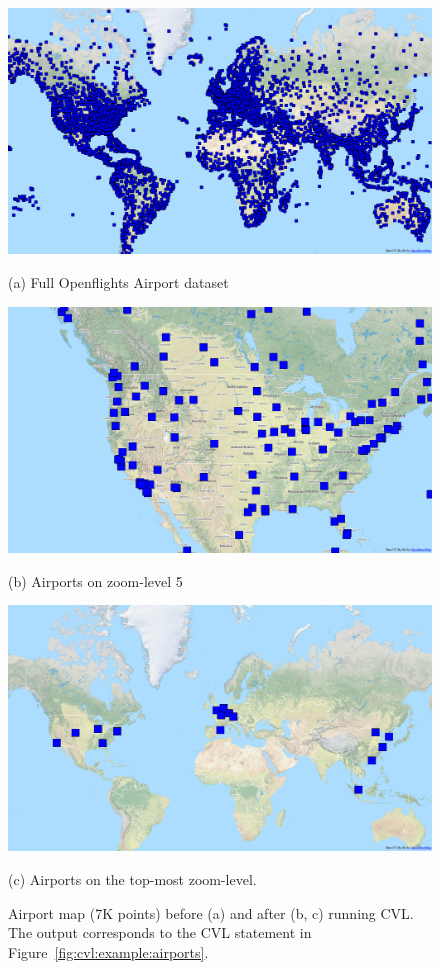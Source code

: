 \begin{figure}[tb]
  \begin{minipage}{0.329\linewidth}
    \centerline{\includegraphics[width=0.95\linewidth]{./figs/airports.png}}
    \centerline{(a) Full Openflights Airport dataset}
  \end{minipage} \hfill
  \begin{minipage}{0.329\linewidth}
    \centerline{\includegraphics[width=0.95\linewidth]{./figs/airports_z4.png}}
    \centerline{(b) Airports on zoom-level 5}
  \end{minipage} \hfill
  \begin{minipage}{0.329\linewidth}
    \centerline{\includegraphics[width=0.95\linewidth]{./figs/airports_z0.png}}
    \centerline{(c) Airports on the top-most zoom-level.}
  \end{minipage}
  \vspace{-0ex}
  \caption{Airport map (7K points) before (a) and after (b, c) running CVL. The output corresponds to the CVL statement in Figure~\ref{fig:cvl:example:airports}.}
  \label{fig:graphical:output:airport}
  \vspace{-2ex}
\end{figure}

